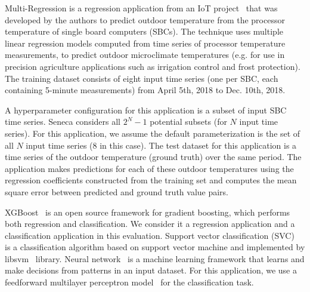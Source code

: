 Multi-Regression is a regression application 
from an IoT project~\cite{iot-cpu} that was developed by the authors
to predict outdoor temperature from the processor 
temperature of single board computers (SBCs).  
The technique uses multiple linear regression models computed from time
series of processor temperature measurements,
to predict outdoor microclimate temperatures (e.g. for use in 
precision agriculture applications such as irrigation control and frost protection).
The training dataset consists of eight input time series (one per SBC, each containing 
5-minute measurements) from April 5th, 2018 to Dec. 10th, 2018.

A hyperparameter configuration for this application is a subset of input SBC time series.
Seneca considers all \texttt{$2^N - 1$} potential subsets (for $N$ input time series).
For this application,
we assume the default parameterization is the set of all $N$ input time series (8 in this case).
The test dataset for this application is a time series of the outdoor temperature (ground truth) 
over the same period.  The application makes predictions for each of these outdoor temperatures
using the regression coefficients constructed from the training set
and computes the mean square error between predicted and ground truth value pairs.

XGBoost~\cite{ref:xgboost-web} is an open source framework for gradient boosting, which 
performs both regression and classification. We consider it a regression application and
a classification application in this evaluation.  
Support vector classification (SVC)~\cite{ref:svc} is a classification algorithm 
based on support vector machine and implemented by libsvm~\cite{ref:libsvm} library.
Neural network~\cite{ref:neural_network} is a machine learning framework that learns 
and make decisions from patterns in an input dataset. For this application, 
we use a feedforward multilayer perceptron model~\cite{ref:feedforward_nn} 
for the classification task.

